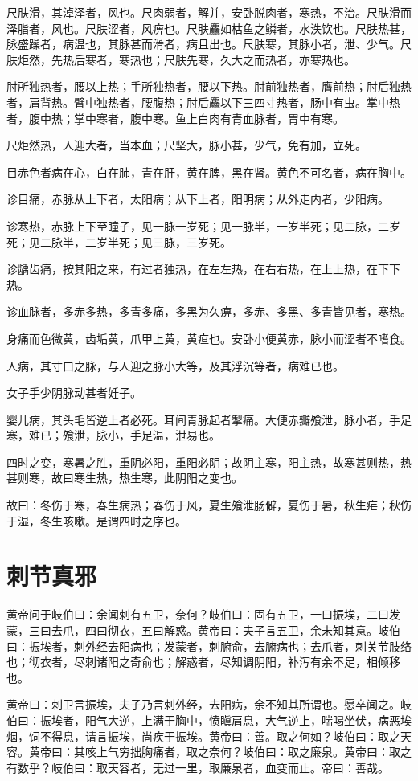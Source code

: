 \documentclass[a4paper,12pt,UTF8,twoside]{ctexbook}
\begin{document}
	尺肤滑，其淖泽者，风也。尺肉弱者，解并，安卧脱肉者，寒热，不治。尺肤滑而泽脂者，风也。尺肤涩者，风痹也。尺肤麤如枯鱼之鳞者，水泆饮也。尺肤热甚，脉盛躁者，病温也，其脉甚而滑者，病且出也。尺肤寒，其脉小者，泄、少气。尺肤炬然，先热后寒者，寒热也；尺肤先寒，久大之而热者，亦寒热也。
	
	肘所独热者，腰以上热；手所独热者，腰以下热。肘前独热者，膺前热；肘后独热者，肩背热。臂中独热者，腰腹热；肘后麤以下三四寸热者，肠中有虫。掌中热者，腹中热；掌中寒者，腹中寒。鱼上白肉有青血脉者，胃中有寒。
	
	尺炬然热，人迎大者，当本血；尺坚大，脉小甚，少气，免有加，立死。
	
	目赤色者病在心，白在肺，青在肝，黄在脾，黑在肾。黄色不可名者，病在胸中。
	
	诊目痛，赤脉从上下者，太阳病；从下上者，阳明病；从外走内者，少阳病。
	
	诊寒热，赤脉上下至瞳子，见一脉一岁死；见一脉半，一岁半死；见二脉，二岁死；见二脉半，二岁半死；见三脉，三岁死。
	
	诊龋齿痛，按其阳之来，有过者独热，在左左热，在右右热，在上上热，在下下热。
	
	诊血脉者，多赤多热，多青多痛，多黑为久痹，多赤、多黑、多青皆见者，寒热。
	
	身痛而色微黄，齿垢黄，爪甲上黄，黄疸也。安卧小便黄赤，脉小而涩者不嗜食。
	
	人病，其寸口之脉，与人迎之脉小大等，及其浮沉等者，病难已也。
	
	女子手少阴脉动甚者妊子。
	
	婴儿病，其头毛皆逆上者必死。耳间青脉起者掣痛。大便赤瓣飧泄，脉小者，手足寒，难已；飧泄，脉小，手足温，泄易也。
	
	四时之变，寒暑之胜，重阴必阳，重阳必阴；故阴主寒，阳主热，故寒甚则热，热甚则寒，故曰寒生热，热生寒，此阴阳之变也。
	
	故曰：冬伤于寒，春生病热；春伤于风，夏生飧泄肠僻，夏伤于暑，秋生疟；秋伤于湿，冬生咳嗽。是谓四时之序也。
	
	\chapter{刺节真邪}
	
	黄帝问于岐伯曰：余闻刺有五卫，奈何？岐伯曰：固有五卫，一曰振埃，二曰发蒙，三曰去爪，四曰彻衣，五曰解惑。黄帝曰：夫子言五卫，余未知其意。岐伯曰：振埃者，刺外经去阳病也；发蒙者，刺腑俞，去腑病也；去爪者，刺关节肢络也；彻衣者，尽刺诸阳之奇俞也；解惑者，尽知调阴阳，补泻有余不足，相倾移也。
	
	黄帝曰：刺卫言振埃，夫子乃言刺外经，去阳病，余不知其所谓也。愿卒闻之。岐伯曰：振埃者，阳气大逆，上满于胸中，愤瞋肩息，大气逆上，喘喝坐伏，病恶埃烟，饲不得息，请言振埃，尚疾于振埃。黄帝曰：善。取之何如？岐伯曰：取之天容。黄帝曰：其咳上气穷拙胸痛者，取之奈何？岐伯曰：取之廉泉。黄帝曰：取之有数乎？岐伯曰：取天容者，无过一里，取廉泉者，血变而止。帝曰：善哉。
	
\end{document}
